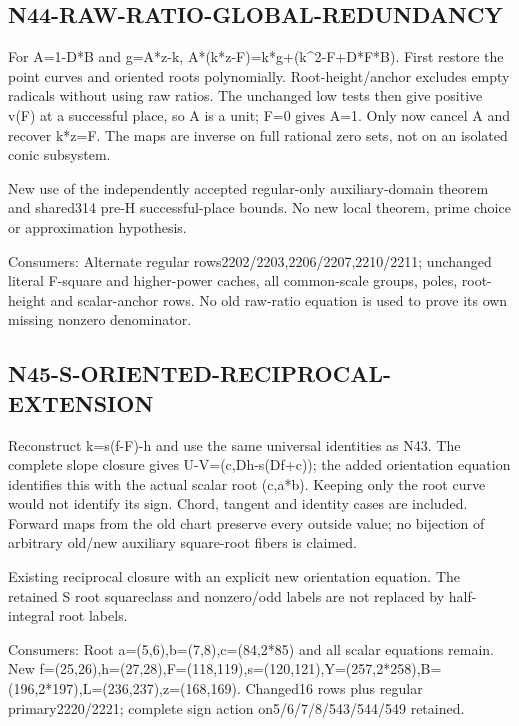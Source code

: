 \documentclass{article}
\begin{document}
\subsection{N44-RAW-RATIO-GLOBAL-REDUNDANCY}
\label{outline:r6-n44-raw-ratio-global-redundancy}
For A=1-D*B and g=A*z-k, A*(k*z-F)=k*g+(k\textasciicircum{}2-F+D*F*B). First restore the point curves and oriented roots polynomially. Root-height/anchor excludes empty radicals without using raw ratios. The unchanged low tests then give positive v(F) at a successful place, so A is a unit; F=0 gives A=1. Only now cancel A and recover k*z=F. The maps are inverse on full rational zero sets, not on an isolated conic subsystem.
\par New use of the independently accepted regular-only auxiliary-domain theorem and shared314 pre-H successful-place bounds. No new local theorem, prime choice or approximation hypothesis.
\par Consumers: Alternate regular rows2202/2203,2206/2207,2210/2211; unchanged literal F-square and higher-power caches, all common-scale groups, poles, root-height and scalar-anchor rows. No old raw-ratio equation is used to prove its own missing nonzero denominator.
\subsection{N45-S-ORIENTED-RECIPROCAL-EXTENSION}
\label{outline:r6-n45-s-oriented-reciprocal-extension}
Reconstruct k=s(f-F)-h and use the same universal identities as N43. The complete slope closure gives U-V=(c,Dh-s(Df+c)); the added orientation equation identifies this with the actual scalar root (c,a*b). Keeping only the root curve would not identify its sign. Chord, tangent and identity cases are included. Forward maps from the old chart preserve every outside value; no bijection of arbitrary old/new auxiliary square-root fibers is claimed.
\par Existing reciprocal closure with an explicit new orientation equation. The retained S root squareclass and nonzero/odd labels are not replaced by half-integral root labels.
\par Consumers: Root a=(5,6),b=(7,8),c=(84,2*85) and all scalar equations remain. New f=(25,26),h=(27,28),F=(118,119),s=(120,121),Y=(257,2*258),B=(196,2*197),L=(236,237),z=(168,169). Changed16 rows plus regular primary2220/2221; complete sign action on5/6/7/8/543/544/549 retained.
\end{document}
